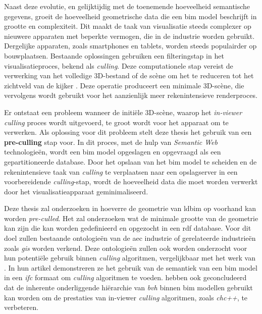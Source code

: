 \begin{refsection}
\begin{multicols}{2}
        Naast deze evolutie, en gelijktijdig met de toenemende hoeveelheid semantische gegevens, groeit de hoeveelheid geometrische data die een \ac{bim} model beschrijft in grootte en complexiteit. Dit maakt de taak van visualisatie steeds complexer op nieuwere apparaten met beperkte vermogen, die in de industrie worden gebruikt. Dergelijke apparaten, zoals smartphones en tablets, worden steeds populairder op bouwplaatsen. Bestaande oplossingen gebruiken een filteringstap in het visualisatieproces, bekend als \emph{culling}. Deze computationele stap vereist de verwerking van het volledige 3D-bestand of de scène om het te reduceren tot het zichtveld van de kijker \parencite{Johansson2015}. Deze operatie produceert een minimale 3D-scène, die vervolgens wordt gebruikt voor het aanzienlijk meer rekenintensieve renderproces.

        Er ontstaat een probleem wanneer de initiële 3D-scène, waarop het \emph{in-viewer culling} proces wordt uitgevoerd, te groot wordt voor het apparaat om te verwerken. Als oplossing voor dit probleem stelt deze thesis het gebruik van een \textbf{pre-culling} stap voor. In dit proces, met de hulp van \emph{Semantic Web} technologieën, wordt een \ac{bim} model opgeslagen en opgevraagd als een gepartitioneerde database. Door het opslaan van het \ac{bim} model te scheiden en de rekenintensieve taak van \emph{culling} te verplaatsen naar een opslagserver in een voorbereidende \emph{culling}-stap, wordt de hoeveelheid data die moet worden verwerkt door het visualisatieapparaat geminimaliseerd.

        Deze thesis zal onderzoeken in hoeverre de geometrie van \ac{ldbim} op voorhand kan worden \emph{pre-culled}. Het zal onderzoeken wat de minimale grootte van de geometrie kan zijn die kan worden gedefinieerd en opgezocht in een \ac{rdf} database. Voor dit doel zullen bestaande ontologieën van de \ac{aec} industrie of gerelateerde industrieën zoals \emph{\ac{gis}} worden verkend. Deze ontologieën zullen ook worden onderzocht voor hun potentiële gebruik binnen \emph{culling} algoritmen, vergelijkbaar met het werk van \cite{Johansson2009}. In hun artikel demonstreren ze het gebruik van de semantiek van een \ac{bim} model in een \emph{\ac{ifc}} formaat om \emph{culling} algoritmen te voeden. \cite{Johansson2015} hebben ook geconcludeerd dat de inherente onderliggende hiërarchie van \emph{\ac{bvh}} binnen \ac{bim} modellen gebruikt kan worden om de prestaties van in-viewer \emph{culling} algoritmen, zoals \emph{\ac{chc}++}, te verbeteren.


\end{multicols}
\end{refsection}
